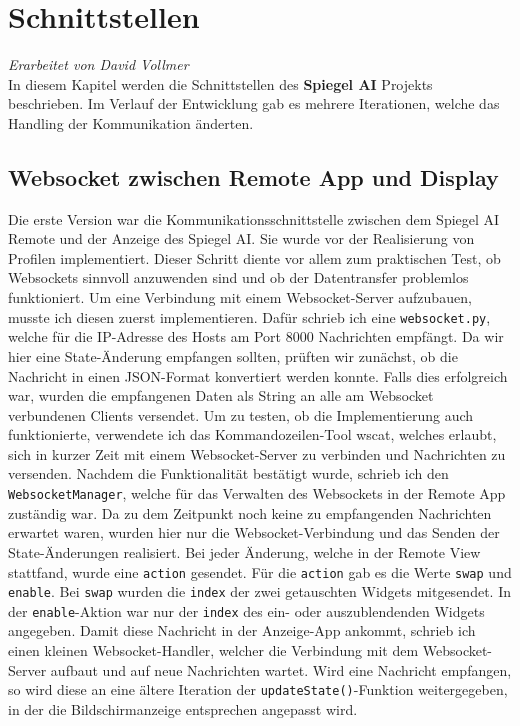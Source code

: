 \chapter{Schnittstellen}
\textit{Erarbeitet von David Vollmer} \\
In diesem Kapitel werden die Schnittstellen des \textbf{Spiegel AI} Projekts beschrieben. Im Verlauf der Entwicklung gab es mehrere Iterationen, welche das Handling der Kommunikation änderten.

\section{Websocket zwischen Remote App und Display}
Die erste Version war die Kommunikationsschnittstelle zwischen dem Spiegel AI Remote und der Anzeige des Spiegel AI. Sie wurde vor der Realisierung von Profilen implementiert. Dieser Schritt diente vor allem zum praktischen Test, ob Websockets sinnvoll anzuwenden sind und ob der Datentransfer problemlos funktioniert. Um eine Verbindung mit einem Websocket-Server aufzubauen, musste ich diesen zuerst implementieren. Dafür schrieb ich eine \texttt{websocket.py}, welche für die IP-Adresse des Hosts am Port 8000 Nachrichten empfängt. Da wir hier eine State-Änderung empfangen sollten, prüften wir zunächst, ob die Nachricht in einen JSON-Format konvertiert werden konnte. Falls dies erfolgreich war, wurden die empfangenen Daten als String an alle am Websocket verbundenen Clients versendet. Um zu testen, ob die Implementierung auch funktionierte, verwendete ich das Kommandozeilen-Tool wscat, welches erlaubt, sich in kurzer Zeit mit einem Websocket-Server zu verbinden und Nachrichten zu versenden. Nachdem die Funktionalität bestätigt wurde, schrieb ich den \texttt{WebsocketManager}, welche für das Verwalten des Websockets in der Remote App zuständig war. Da zu dem Zeitpunkt noch keine zu empfangenden Nachrichten erwartet waren, wurden hier nur die Websocket-Verbindung und das Senden der State-Änderungen realisiert. Bei jeder Änderung, welche in der Remote View stattfand, wurde eine \texttt{action} gesendet. Für die \texttt{action} gab es die Werte \texttt{swap} und \texttt{enable}. Bei \texttt{swap} wurden die \texttt{index} der zwei getauschten Widgets mitgesendet. In der \texttt{enable}-Aktion war nur der \texttt{index} des ein- oder auszublendenden Widgets angegeben. Damit diese Nachricht in der Anzeige-App ankommt, schrieb ich einen kleinen Websocket-Handler, welcher die Verbindung mit dem Websocket-Server aufbaut und auf neue Nachrichten wartet. Wird eine Nachricht empfangen, so wird diese an eine ältere Iteration der \texttt{updateState()}-Funktion weitergegeben, in der die Bildschirmanzeige entsprechen angepasst wird. \\
